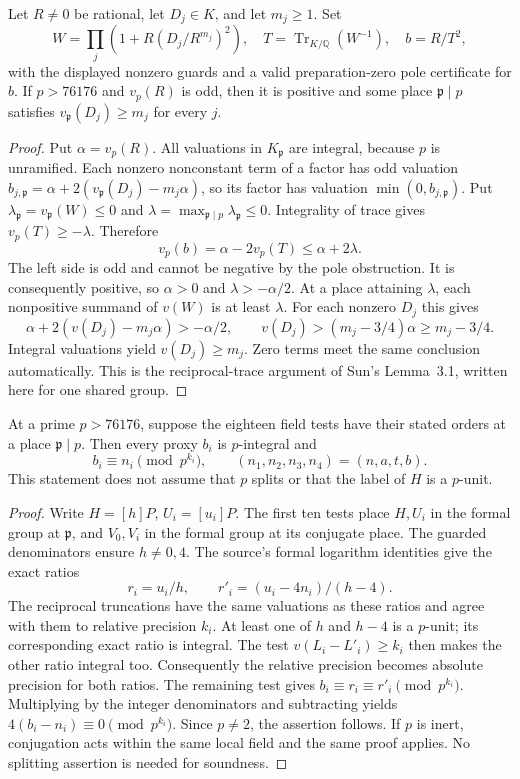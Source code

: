\begin{lemma}
Let $R\ne0$ be rational, let $D_j\in K$, and let $m_j\ge1$.
Set
\[
 W=\prod_j(1+R(D_j/R^{m_j})^2),\quad
 T=\operatorname{Tr}_{K/\mathbb Q}(W^{-1}),\quad b=R/T^2,
\]
with the displayed nonzero guards and a valid preparation-zero pole
certificate for $b$. If $p>76176$ and $v_p(R)$ is odd, then it is
positive and some place $\mathfrak p\mid p$ satisfies
$v_{\mathfrak p}(D_j)\ge m_j$ for every $j$.
\end{lemma}
\begin{proof}
Put $\alpha=v_p(R)$. All valuations in $K_{\mathfrak p}$ are integral,
because $p$ is unramified. Each nonzero nonconstant term of a factor
has odd valuation
$b_{j,\mathfrak p}=\alpha+2(v_{\mathfrak p}(D_j)-m_j\alpha)$,
so its factor has valuation $\min(0,b_{j,\mathfrak p})$. Put
$\lambda_{\mathfrak p}=v_{\mathfrak p}(W)\le0$ and
$\lambda=\max_{\mathfrak p\mid p}\lambda_{\mathfrak p}\le0$.
Integrality of trace gives $v_p(T)\ge-\lambda$. Therefore
\[
 v_p(b)=\alpha-2v_p(T)\le\alpha+2\lambda.
\]
The left side is odd and cannot be negative by the pole obstruction.
It is consequently positive, so $\alpha>0$ and
$\lambda>-\alpha/2$. At a place attaining $\lambda$, each nonpositive
summand of $v(W)$ is at least $\lambda$. For each nonzero $D_j$ this gives
\[
 \alpha+2(v(D_j)-m_j\alpha)>-\alpha/2,
 \qquad v(D_j)>(m_j-3/4)\alpha\ge m_j-3/4.
\]
Integral valuations yield $v(D_j)\ge m_j$. Zero terms meet the same
conclusion automatically. This is the reciprocal-trace argument of
Sun's Lemma~3.1, written here for one shared group.
\end{proof}

\begin{lemma}
At a prime $p>76176$, suppose the eighteen field tests have their stated
orders at a place $\mathfrak p\mid p$. Then every proxy $b_i$ is
$p$-integral and
\[
 b_i\equiv n_i\pmod{p^{k_i}},\qquad
 (n_1,n_2,n_3,n_4)=(n,a,t,b).
\]
This statement does not assume that $p$ splits or that the label of
$H$ is a $p$-unit.
\end{lemma}
\begin{proof}
Write $H=[h]P$, $U_i=[u_i]P$. The first ten tests place $H,U_i$ in
the formal group at $\mathfrak p$, and $V_0,V_i$ in the formal group
at its conjugate place. The guarded denominators ensure $h\ne0,4$.
The source's formal logarithm identities give the exact ratios
\[
 r_i=u_i/h,\qquad r'_i=(u_i-4n_i)/(h-4).
\]
The reciprocal truncations have the same valuations as these ratios
and agree with them to relative precision $k_i$. At least one of $h$
and $h-4$ is a $p$-unit; its corresponding exact ratio is integral.
The test $v(L_i-L'_i)\ge k_i$ then makes the other ratio integral too.
Consequently the relative precision becomes absolute precision for
both ratios. The remaining test gives
$b_i\equiv r_i\equiv r'_i\pmod{p^{k_i}}$. Multiplying by the integer
denominators and subtracting yields
$4(b_i-n_i)\equiv0\pmod{p^{k_i}}$. Since $p\ne2$, the assertion follows.
If $p$ is inert, conjugation acts within the same local field and the
same proof applies. No splitting assertion is needed for soundness.
\end{proof}

